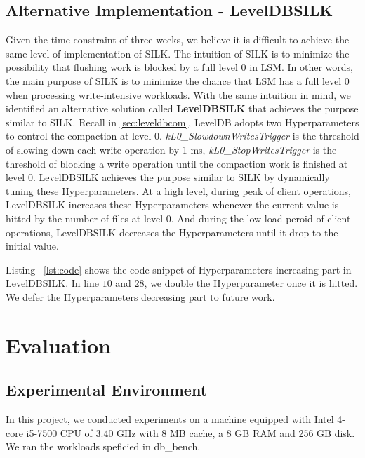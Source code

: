 \documentclass[letter,twocolumn,10pt]{article}
\begin{document}
\subsection {Alternative Implementation - LevelDBSILK}
Given the time constraint of three weeks, we believe it is difficult to achieve the same level of implementation of SILK. The intuition of SILK is to minimize the possibility that flushing work is blocked by a full level $0$ in LSM. In other words, the main purpose of SILK is to minimize the chance that LSM has a full level $0$ when processing write-intensive workloads. With the same intuition in mind, we identified an alternative solution called \textbf{LevelDBSILK} that achieves the purpose similar to SILK. Recall in \ref{sec:leveldbcom}, LevelDB adopts two Hyperparameters to control the compaction at level $0$. \textit{kL0\_SlowdownWritesTrigger} is the threshold of slowing down each write operation by 1 ms, \textit{kL0\_StopWritesTrigger} is the threshold of blocking a write operation until the compaction work is finished at level $0$. LevelDBSILK achieves the purpose similar to SILK by dynamically tuning these Hyperparameters. At a high level, during peak of client operations, LevelDBSILK increases these Hyperparameters whenever the current value is hitted by the number of files at level $0$. And during the low load peroid of client operations, LevelDBSILK decreases the Hyperparameters until it drop to the initial value.


Listing ~\ref{lst:code} shows the code snippet of Hyperparameters increasing part in LevelDBSILK. In line $10$ and $28$, we double the Hyperparameter once it is hitted. We defer the Hyperparameters decreasing part to future work.
\section{Evaluation}
\label{sec:evaluation}
\subsection {Experimental Environment}
In this project, we conducted experiments on a machine equipped with Intel 4-core
i5-7500 CPU of 3.40 GHz with 8 MB cache, a 8 GB RAM and 256 GB disk. We ran the workloads speficied in \textsf{db\_bench}. 
\end{document}
